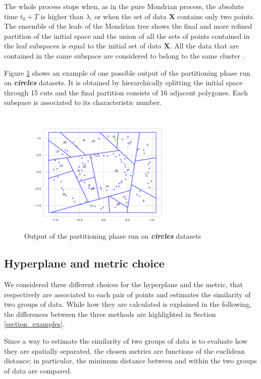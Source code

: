 \documentclass[a4paper]{article}
\begin{document}
The whole process stops when, as in the pure Mondrian process, the absolute time $t_0+T$ is higher than $\lambda$, or when the set of data $\pmb{X}$ contains only two points.
The ensemble of the leafs of the Mondrian tree shows the final and more refined partition of the initial space and the union of all the sets of points contained in the leaf subspaces is equal to the initial set of data $\pmb{X}$.
All the data that are contained in the same subspace are considered to belong to the same cluster .


Figure \ref{partition} shows an example of one possible output of the partitioning phase run on \emph{\textbf{circles}} datasets. %
It is obtained by hierarchically splitting the initial space through 15 cuts and the final partition consists of 16 adjacent polygones.
Each subspace is associated to its characteristic number.


\begin{figure}[H]
        \centering
\includegraphics[width=8cm]{grafici/circles_partitioning.png}
\caption{Output of the partitioning phase run on \emph{\textbf{circles}} datasets}
\label{partition}
    \end{figure}   





\subsection*{Hyperplane and metric choice}

We considered three different choices for the hyperplane and the metric, that respectively are associated to each pair of points and estimates the similarity of two groups of data.
While how they are calculated is explained in the following, the differences between the three methods are highlighted in Section \ref{section_examples}.

Since a way to estimate the similarity of two groups of data is to evaluate how they are spatially separated, the chosen metrics are functions of the euclidean distance;
in particular, the minimum distance between and within the two groups of data are compared.
\end{document}
